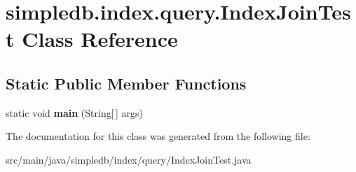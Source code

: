 \hypertarget{classsimpledb_1_1index_1_1query_1_1IndexJoinTest}{}\section{simpledb.\+index.\+query.\+Index\+Join\+Test Class Reference}
\label{classsimpledb_1_1index_1_1query_1_1IndexJoinTest}
\subsection*{Static Public Member Functions}
\begin{DoxyCompactItemize}
\item 
\mbox{\label{classsimpledb_1_1index_1_1query_1_1IndexJoinTest_a49dfc429140965bd6782fdce791f2710}} 
static void {\bfseries main} (String\mbox{[}$\,$\mbox{]} args)
\end{DoxyCompactItemize}


The documentation for this class was generated from the following file\+:\begin{DoxyCompactItemize}
\item 
src/main/java/simpledb/index/query/Index\+Join\+Test.\+java\end{DoxyCompactItemize}
